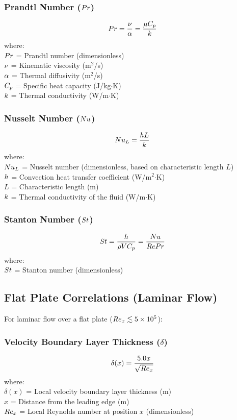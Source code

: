 \subsubsection*{Prandtl Number ($Pr$)}
\begin{equation}
    Pr = \frac{\nu}{\alpha} = \frac{\mu C_p}{k}
\end{equation}
where: \\
$Pr$ = Prandtl number (dimensionless) \\
$\nu$ = Kinematic viscosity (m$^2$/s) \\
$\alpha$ = Thermal diffusivity (m$^2$/s) \\
$C_p$ = Specific heat capacity (J/kg$\cdot$K) \\
$k$ = Thermal conductivity (W/m$\cdot$K)

\subsubsection*{Nusselt Number ($Nu$)}
\begin{equation}
    Nu_L = \frac{h L}{k}
\end{equation}
where: \\
$Nu_L$ = Nusselt number (dimensionless, based on characteristic length $L$) \\
$h$ = Convection heat transfer coefficient (W/m$^2$$\cdot$K) \\
$L$ = Characteristic length (m) \\
$k$ = Thermal conductivity of the fluid (W/m$\cdot$K)

\subsubsection*{Stanton Number ($St$)}
\begin{equation}
    St = \frac{h}{\rho V C_p} = \frac{Nu}{Re Pr}
\end{equation}
where: \\
$St$ = Stanton number (dimensionless)

\subsection{Flat Plate Correlations (Laminar Flow)}
For laminar flow over a flat plate ($ Re_x \lesssim 5 \times 10^5 $):
\subsubsection*{Velocity Boundary Layer Thickness ($\delta$)}
\begin{equation}
    \delta(x) = \frac{5.0 x}{\sqrt{Re_x}}
\end{equation}
where: \\
$\delta(x)$ = Local velocity boundary layer thickness (m) \\
$x$ = Distance from the leading edge (m) \\
$Re_x$ = Local Reynolds number at position $x$ (dimensionless)


